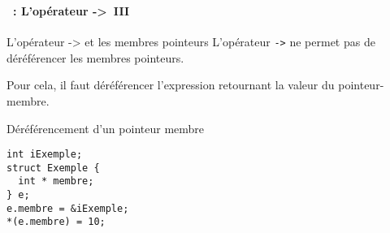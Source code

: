 \begin{frame}[containsverbatim]
  \frametitle{\secname}
  \framesubtitle{\subsecname~: L'opérateur ->~III}

  \begin{alertblock}{L'opérateur -> et les membres pointeurs}
    L'opérateur \texttt{->} ne permet pas de déréférencer les membres pointeurs. 
    \vspace{0.3cm}
    \par
    Pour cela, il faut déréférencer l'expression retournant
    la valeur du pointeur-membre.
  \end{alertblock}
  \begin{exampleblock}{Déréférencement d'un pointeur membre}
    \begin{verbatim}
int iExemple;
struct Exemple {
  int * membre;
} e;
e.membre = &iExemple;
*(e.membre) = 10;\end{verbatim}
  \end{exampleblock} 
\end{frame}

